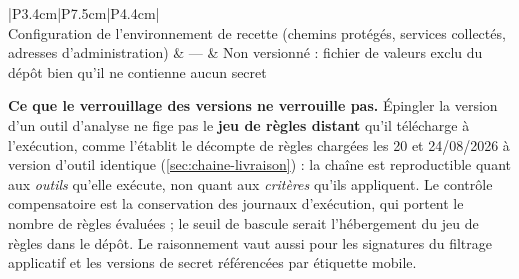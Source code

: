 \begin{longtable}{|P{3.4cm}|P{7.5cm}|P{4.4cm}|}
 \\ \hline
Configuration de l'environnement de recette (chemins protégés, services collectés, adresses
d'administration) &
--- &
Non versionné : fichier de valeurs exclu du dépôt bien qu'il ne contienne aucun secret \\
\end{longtable}
\endgroup

\medskip

\begin{alertbox}[boxsep=1pt, left=4pt, right=4pt, top=3pt, bottom=3pt]
\textbf{Ce que le verrouillage des versions ne verrouille pas.} Épingler la version d'un outil
d'analyse ne fige pas le \textbf{jeu de règles distant} qu'il télécharge à l'exécution, comme
l'établit le décompte de règles chargées les 20 et 24/08/2026 à version d'outil identique
(\cref{sec:chaine-livraison}) : la chaîne est reproductible quant aux \emph{outils} qu'elle
exécute, non quant aux \emph{critères} qu'ils appliquent. Le contrôle compensatoire est la
conservation des journaux d'exécution, qui portent le nombre de règles évaluées ; le seuil de
bascule serait l'hébergement du jeu de règles dans le dépôt. Le raisonnement vaut aussi pour les
signatures du filtrage applicatif et les versions de secret référencées par étiquette mobile.
\end{alertbox}
